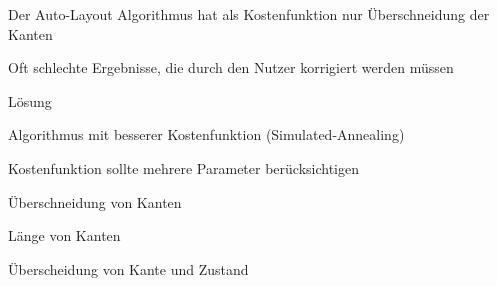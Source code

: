 {
    \begin{itemgroup}{}
	\item Der Auto-Layout Algorithmus hat als Kostenfunktion nur Über\-schnei\-dung
	der Kanten
	\item Oft schlechte Ergebnisse, die durch den Nutzer korrigiert werden müssen
    \end{itemgroup}

    \begin{itemgroup}{Lösung}
	\item Algorithmus mit besserer Kostenfunktion (Simulated-Annealing)
	\item Kostenfunktion sollte mehrere Parameter berücksichtigen
		\begin{itemgroup}{}
		\item Überschneidung von Kanten
		\item Länge von Kanten
		\item Überscheidung von Kante und Zustand
		\end{itemgroup}
	\end{itemgroup}
    
    \vfill{}
}


